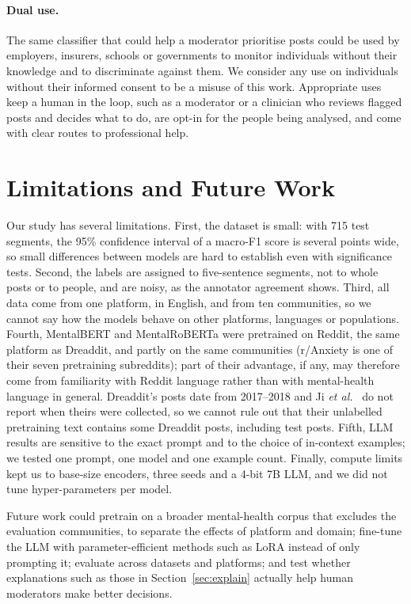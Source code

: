 \paragraph{Dual use.} The same classifier that could help a moderator prioritise posts could be used
by employers, insurers, schools or governments to monitor individuals without their knowledge and
to discriminate against them. We consider any use on individuals without their informed consent to
be a misuse of this work. Appropriate uses keep a human in the loop, such as a moderator or a
clinician who reviews flagged posts and decides what to do, are opt-in for the people being analysed,
and come with clear routes to professional help.

\section{Limitations and Future Work}
Our study has several limitations. First, the dataset is small: with 715 test segments, the 95\%
confidence interval of a macro-F1 score is several points wide, so small differences between models
are hard to establish even with significance tests. Second, the labels are assigned to five-sentence
segments, not to whole posts or to people, and are noisy, as the annotator agreement shows. Third, all
data come from one platform, in English, and from ten communities, so we cannot say how the models
behave on other platforms, languages or populations. Fourth, MentalBERT and MentalRoBERTa were
pretrained on Reddit, the same platform as Dreaddit, and partly on the same communities (r/Anxiety is one of their seven pretraining subreddits);
part of their advantage, if any, may therefore come from familiarity with Reddit language rather
than with mental-health language in general. Dreaddit's posts date from 2017--2018 and Ji
{\it et al.}~ do not report when theirs were collected, so we cannot rule
out that their unlabelled pretraining text contains some Dreaddit posts, including test posts.
Fifth, LLM results are sensitive to the exact prompt and to the choice of in-context examples; we
tested one prompt, one model and one example count. Finally, compute limits kept us to base-size
encoders, three seeds and a 4-bit 7B LLM, and we did not tune hyper-parameters per model.

Future work could pretrain on a broader mental-health corpus that excludes the evaluation
communities, to separate the effects of platform and domain; fine-tune the LLM with
parameter-efficient methods such as LoRA instead of only prompting it; evaluate across datasets and
platforms; and test whether explanations such as those in Section~\ref{sec:explain} actually help
human moderators make better decisions.

